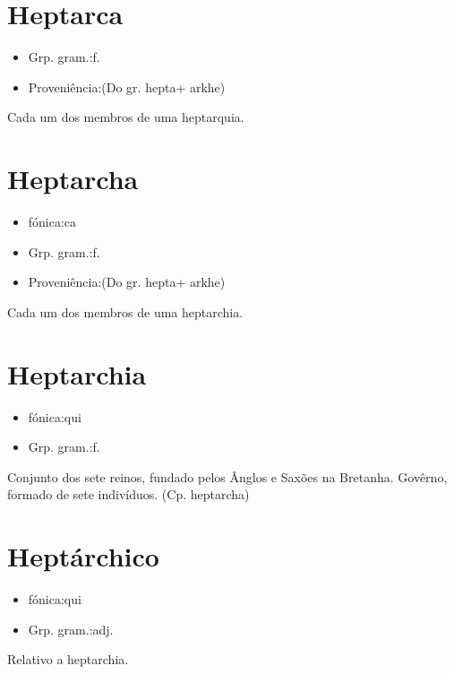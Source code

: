 \documentclass{article}
\begin{document}
\section{Heptarca}
\begin{itemize}
\item {Grp. gram.:f.}
\end{itemize}
\begin{itemize}
\item {Proveniência:(Do gr. \textunderscore hepta\textunderscore  + \textunderscore arkhe\textunderscore )}
\end{itemize}
Cada um dos membros de uma heptarquia.
\section{Heptarcha}
\begin{itemize}
\item {fónica:ca}
\end{itemize}
\begin{itemize}
\item {Grp. gram.:f.}
\end{itemize}
\begin{itemize}
\item {Proveniência:(Do gr. \textunderscore hepta\textunderscore  + \textunderscore arkhe\textunderscore )}
\end{itemize}
Cada um dos membros de uma heptarchia.
\section{Heptarchia}
\begin{itemize}
\item {fónica:qui}
\end{itemize}
\begin{itemize}
\item {Grp. gram.:f.}
\end{itemize}
Conjunto dos sete reinos, fundado pelos Ânglos e Saxões na Bretanha.
Govêrno, formado de sete indivíduos.
(Cp. \textunderscore heptarcha\textunderscore )
\section{Heptárchico}
\begin{itemize}
\item {fónica:qui}
\end{itemize}
\begin{itemize}
\item {Grp. gram.:adj.}
\end{itemize}
Relativo a heptarchia.
\end{document}

